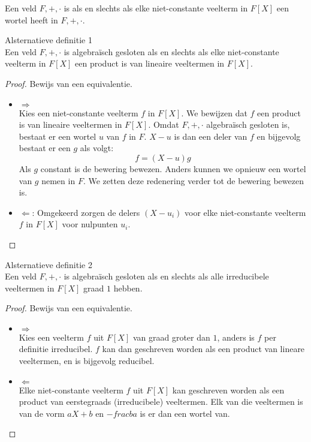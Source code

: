 \documentclass[main.tex]{subfiles}
\begin{document}
\begin{de}
  Een veld $F,+,\cdot$ is  als en slechts als elke niet-constante veelterm in $F[X]$ een wortel heeft in $F,+,\cdot$.
\end{de}

\begin{st}
  Alsternatieve definitie 1\\
  Een veld $F,+,\cdot$ is algebra\"isch gesloten als en slechts als elke niet-constante veelterm in $F[X]$ een product is van lineaire veeltermen in $F[X]$.

  \begin{proof}
    Bewijs van een equivalentie.
    \begin{itemize}
    \item $\Rightarrow$\\
      Kies een niet-constante veelterm $f$ in $F[X]$.
      We bewijzen dat $f$ een product is van lineaire veeltermen in $F[X]$.
      Omdat $F,+,\cdot$ algebra\"isch gesloten is, bestaat er een wortel $u$ van $f$ in $F$.
      $X-u$ is dan een deler van $f$ en bijgevolg bestaat er een $g$ als volgt:
      \[ f= (X-u)g \]
      Als $g$ constant is de bewering bewezen.
      Anders kunnen we opnieuw een wortel van $g$ nemen in $F$.
      We zetten deze redenering verder tot de bewering bewezen is.
    \item $\Leftarrow$: Omgekeerd zorgen de delers $(X-u_{i})$ voor elke niet-constante veelterm $f$ in $F[X]$ voor nulpunten $u_{i}$.
    \end{itemize}
  \end{proof}
\end{st}

\begin{st}
  Alsternatieve definitie 2\\
  Een veld $F,+,\cdot$ is algebra\"isch gesloten als en slechts als alle irreducibele veeltermen in $F[X]$ graad $1$ hebben.

  \begin{proof}
    Bewijs van een equivalentie.
    \begin{itemize}
    \item $\Rightarrow$\\
      Kies een veelterm $f$ uit $F[X]$ van graad groter dan $1$, anders is $f$ per definitie irreducibel.
      $f$ kan dan geschreven worden als een product van lineare veeltermen, en is bijgevolg reducibel.
    \item $\Leftarrow$\\
      Elke niet-constante veelterm $f$ uit $F[X]$ kan geschreven worden als een product van eerstegraads (irreducibele) veeltermen.
      Elk van die veeltermen is van de vorm $aX+b$ en $-frac{b}{a}$ is er dan een wortel van.
    \end{itemize}
  \end{proof}
\end{st}
\end{document}
